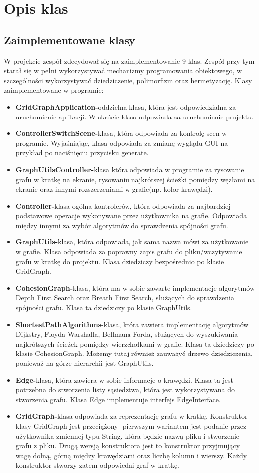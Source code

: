 \documentclass[10pt]{article}
\begin{document}
\section{Opis klas}
\subsection{Zaimplementowane klasy}
W projekcie zespół zdecydował się na zaimplementowanie 9 klas. Zespół przy tym starał się w pełni wykorzystywać mechanizmy programowania obiektowego, w szczególności wykorzystywać dziedziczenie, polimorfizm oraz hermetyzację. Klasy zaimplementowane w programie:
\begin{itemize}
    \item \textbf{GridGraphApplication-}oddzielna klasa, która jest odpowiedzialna za uruchomienie aplikacji. W skrócie klasa odpowiada za uruchomienie projektu.
    \item \textbf{ControllerSwitchScene-}klasa, która odpowiada za kontrolę scen w programie. Wyjaśniając, klasa odpowiada za zmianę wyglądu GUI na przykład po naciśnięciu przycisku generate.
    \item \textbf{GraphUtilsController-}klasa która odpowiada w programie za rysowanie grafu w kratkę na ekranie, rysowaniu najkrótszej ścieżki pomiędzy węzłami na ekranie oraz innymi rozszerzeniami w grafie(np. kolor krawędzi).
    \item \textbf{Controller-}klasa ogólna kontrolerów, która odpowiada za najbardziej podstawowe operacje wykonywane przez użytkownika na grafie. Odpowiada między innymi za wybór algorytmów do sprawdzenia spójności grafu.
    \item \textbf{GraphUtils-}klasa, która odpowiada, jak sama nazwa mówi za użytkowanie w grafie. Klasa odpowiada za poprawny zapis grafu do pliku/wczytywanie grafu w kratkę do projektu. Klasa dziedziczy bezpośrednio po klasie GridGraph.
    \item \textbf{CohesionGraph-}klasa, która ma w sobie zawarte implementacje algorytmów Depth First Search oraz Breath First Search, służących do sprawdzenia spójności grafu. Klasa ta dziedziczy po klasie GraphUtils.
    \item \textbf{ShortestPathAlgorithms}-klasa, która zawiera implementację algorytmów Dijkstry, Floyda-Warshalla, Bellmana-Forda, służących do wyszukiwania najkrótszych ścieżek pomiędzy wierzchołkami w grafie. Klasa ta dziedziczy po klasie CohesionGraph. Możemy tutaj również zauważyć drzewo dziedziczenia, ponieważ na górze hierarchii jest GraphUtils.
    \item \textbf{Edge-}klasa, która zawiera w sobie informacje o krawędzi. Klasa ta jest potrzebna do stworzenia listy sąsiedztwa, która jest wykorzystywana do stworzenia grafu. Klasa Edge implementuje interfejs EdgeInterface.
    \item \textbf{GridGraph-}klasa odpowiada za reprezentację grafu w kratkę. Konstruktor klasy GridGraph jest przeciążony- pierwszym wariantem jest podanie przez użytkownika zmiennej typu String, która będzie nazwą pliku i stworzenie grafu z pliku. Drugą wersją konstruktora jest to konstruktor przyjmujący wagę dolną, górną między krawędziami oraz liczbę kolumn i wierszy. Każdy konstruktor stworzy zatem odpowiedni graf w kratkę.
\end{itemize}
\end{document}
